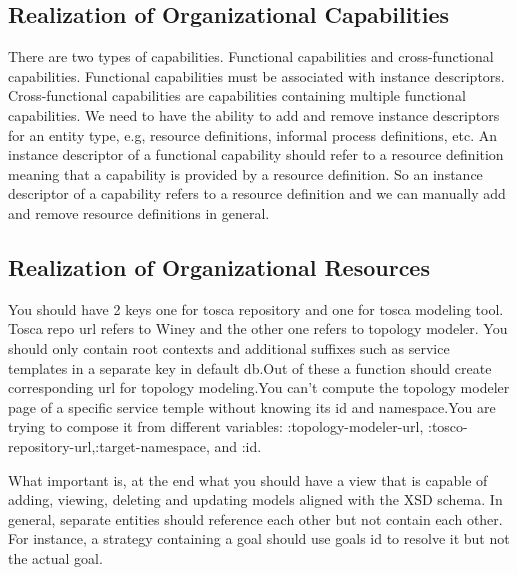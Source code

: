 \subsection{Realization of Organizational Capabilities}
 There are two types of capabilities. Functional capabilities and cross-functional capabilities. Functional capabilities must be associated with instance descriptors. Cross-functional capabilities are capabilities containing multiple functional capabilities. We need to have the ability to add and remove instance descriptors for an entity type, e.g, resource definitions,  informal process definitions, etc. An instance descriptor of a functional capability should refer to a resource definition meaning that a capability is provided by a resource definition. So an instance descriptor of a capability refers to a resource definition and we can manually add and remove resource definitions in general.




\subsection{Realization of Organizational Resources}
You should have 2 keys one for tosca repository and one for tosca modeling tool. Tosca repo url refers to Winey and the other one refers to topology modeler. You should only contain root contexts and additional suffixes such as service templates in a separate key in default db.Out of these a function should create corresponding url for topology modeling.You can’t compute the topology modeler page of a specific service temple without knowing its id and namespace.You are trying to compose it from different variables: :topology-modeler-url, :tosco-repository-url,:target-namespace, and :id.




 What important is, at the end what you should have a view that is capable of adding, viewing, deleting and updating models aligned with the XSD schema. In general, separate entities should reference each other but not contain each other. For instance, a strategy containing a goal should use goals id to resolve it but not the actual goal.
 

